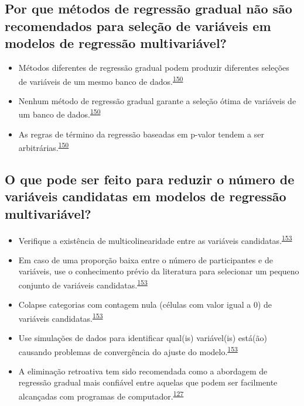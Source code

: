 \documentclass[
  a4paper,
]{book}
\begin{document}
\hypertarget{por-que-muxe9todos-de-regressuxe3o-gradual-nuxe3o-suxe3o-recomendados-para-seleuxe7uxe3o-de-variuxe1veis-em-modelos-de-regressuxe3o-multivariuxe1vel}{%
\subsection{Por que métodos de regressão gradual não são recomendados para seleção de variáveis em modelos de regressão multivariável?}\label{por-que-muxe9todos-de-regressuxe3o-gradual-nuxe3o-suxe3o-recomendados-para-seleuxe7uxe3o-de-variuxe1veis-em-modelos-de-regressuxe3o-multivariuxe1vel}}

\begin{itemize}
\item
  Métodos diferentes de regressão gradual podem produzir diferentes seleções de variáveis de um mesmo banco de dados.\textsuperscript{\protect\hyperlink{ref-Healy1995}{150}}
\item
  Nenhum método de regressão gradual garante a seleção ótima de variáveis de um banco de dados.\textsuperscript{\protect\hyperlink{ref-Healy1995}{150}}
\item
  As regras de término da regressão baseadas em p-valor tendem a ser arbitrárias.\textsuperscript{\protect\hyperlink{ref-Healy1995}{150}}
\end{itemize}

\hypertarget{o-que-pode-ser-feito-para-reduzir-o-nuxfamero-de-variuxe1veis-candidatas-em-modelos-de-regressuxe3o-multivariuxe1vel}{%
\subsection{O que pode ser feito para reduzir o número de variáveis candidatas em modelos de regressão multivariável?}\label{o-que-pode-ser-feito-para-reduzir-o-nuxfamero-de-variuxe1veis-candidatas-em-modelos-de-regressuxe3o-multivariuxe1vel}}

\begin{itemize}
\item
  Verifique a existência de multicolinearidade entre as variáveis candidatas.\textsuperscript{\protect\hyperlink{ref-Sun1996}{153}}
\item
  Em caso de uma proporção baixa entre o número de participantes e de variáveis, use o conhecimento prévio da literatura para selecionar um pequeno conjunto de variáveis candidatas.\textsuperscript{\protect\hyperlink{ref-Sun1996}{153}}
\item
  Colapse categorias com contagem nula (células com valor igual a 0) de variáveis candidatas.\textsuperscript{\protect\hyperlink{ref-Sun1996}{153}}
\item
  Use simulações de dados para identificar qual(is) variável(is) está(ão) causando problemas de convergência do ajuste do modelo.\textsuperscript{\protect\hyperlink{ref-Sun1996}{153}}
\item
  A eliminação retroativa tem sido recomendada como a abordagem de regressão gradual mais confiável entre aquelas que podem ser facilmente alcançadas com programas de computador.\textsuperscript{\protect\hyperlink{ref-heinze2016}{127}}
\end{itemize}
\end{document}
